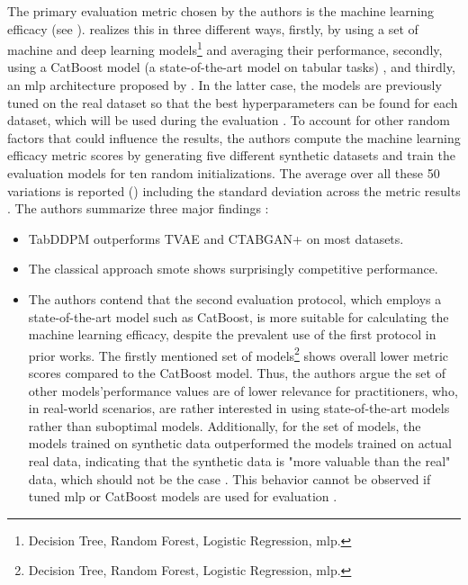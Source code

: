 The primary evaluation metric chosen by the authors is the machine learning efficacy (see ).
\textcite{kotelnikov2022TabDDPMModellingTabular} realizes this in three different ways, firstly, by using a set of machine and deep learning \glspl{model}\footnote[5]{Decision Tree, Random Forest, Logistic Regression, \gls{mlp}.} and averaging their performance,
secondly, using a CatBoost \cite{prokhorenkova2018CatBoostUnbiasedBoosting} \gls{model} (a state-of-the-art \gls{model} on tabular tasks) \cite{kotelnikov2022TabDDPMModellingTabular}, and thirdly, an \gls{mlp} architecture proposed by \cite{gorishniy2021RevisitingDeepLearning}.
In the latter case, the \glspl{model} are previously tuned on the real dataset so that the best hyperparameters can be found for each dataset, which will be used during the evaluation \cite{kotelnikov2022TabDDPMModellingTabular}.
To account for other random factors that could influence the results, the authors compute the machine learning efficacy metric scores by generating five different synthetic datasets and train the evaluation \glspl{model} for ten random initializations.
The average over all these 50 variations is reported (\cite[Table 3, 4, p. 8]{kotelnikov2022TabDDPMModellingTabular}) including the standard deviation across the metric results \cite{kotelnikov2022TabDDPMModellingTabular}.
\newpage
\noindent The authors summarize three major findings \cite{kotelnikov2022TabDDPMModellingTabular}:
\begin{itemize}
    \item TabDDPM outperforms TVAE and CTABGAN+ on most datasets.
    \item The classical approach \gls{smote} shows surprisingly competitive performance.
    \item The authors contend that the second evaluation protocol, which employs a state-of-the-art \gls{model} such as CatBoost, is more suitable for calculating the machine learning efficacy, 
    despite the prevalent use of the first protocol in prior works. 
    The firstly mentioned set of \glspl{model}\footnote[5]{Decision Tree, Random Forest, Logistic Regression, \gls{mlp}.} shows overall lower metric scores compared to the CatBoost \gls{model}.
    Thus, the authors argue the set of other \glspl{model}'\footnotemark[5] performance values are of lower relevance for practitioners, who, in real-world scenarios, are rather interested in using state-of-the-art \glspl{model} rather than suboptimal \glspl{model}.
    Additionally, for the set of \glspl{model}, the \glspl{model} trained on synthetic data outperformed the \glspl{model} trained on actual real data, indicating that the 
    synthetic data is "more valuable than the real" data, which should not be the case \cite[p. 8]{kotelnikov2022TabDDPMModellingTabular}.
    This behavior cannot be observed if tuned \gls{mlp} or CatBoost \glspl{model} are used for evaluation \cite{kotelnikov2022TabDDPMModellingTabular}.
\end{itemize}

